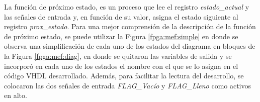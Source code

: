 La función de próximo estado, es un proceso que lee el registro \textit{estado\_actual} y las señales de entrada y, en función de su valor, asigna el estado siguiente al registro \textit{prox\_estado}. Para una mejor comprensión de la descripción de la función de próximo estado, se puede utilizar la Figura \ref{fpga:mef:simple} en donde se observa una simplificación de cada uno de los estados del diagrama en bloques de la Figura \ref{fpga:mef:diag}, en donde se quitaron las variables de salida y se incorporó en cada uno de los estados el nombre con el que se lo asigna en el código VHDL desarrollado. Además, para facilitar la lectura del desarrollo, se colocaron las dos señales de entrada \textit{FLAG\_Vacío} y \textit{FLAG\_Lleno} como activos en alto.

